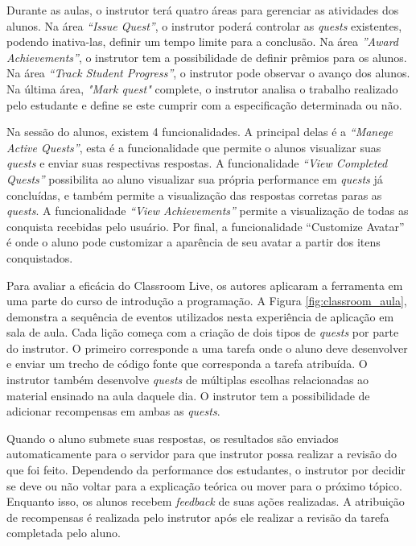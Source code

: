 \documentclass[
	12pt,				%
	oneside,			%
	a4paper,			%
	english,			%
	french,				%
	spanish,			%
	brazil,				%
	]{abntex2}
\begin{document}
Durante as aulas, o instrutor terá quatro áreas para gerenciar as atividades dos alunos. Na área \textit{“Issue Quest”}, o instrutor poderá controlar as \textit{quests} existentes, podendo inativa-las, definir um tempo limite para a conclusão. Na área \textit{”Award Achievements”}, o instrutor tem a possibilidade de definir prêmios para os alunos. Na área \textit{“Track Student Progress”}, o instrutor pode observar o avanço dos alunos. Na última área, \textit{"Mark quest"} complete, o instrutor analisa o trabalho realizado pelo estudante e define se este cumprir com a especificação determinada ou não.

Na sessão do alunos, existem 4 funcionalidades. A principal delas é a \textit{“Manege Active Quests”}, esta é a funcionalidade que permite o alunos visualizar suas \textit{quests} e enviar suas respectivas respostas. A funcionalidade \textit{“View Completed Quests”} possibilita ao aluno visualizar sua própria performance em \textit{quests} já concluídas, e também permite a visualização das respostas corretas paras as \textit{quests}. A funcionalidade \textit{“View Achievements”} permite a visualização de todas as conquista recebidas pelo usuário. Por final, a funcionalidade “Customize Avatar” é onde o aluno pode customizar a aparência de seu avatar a partir dos itens conquistados.

Para avaliar a eficácia do Classroom Live, os autores aplicaram a ferramenta em uma parte do curso de introdução a programação. A Figura \ref{fig:classroom_aula}, demonstra a sequência de eventos utilizados nesta experiência de aplicação em sala de aula. Cada lição começa com a criação de dois tipos de \textit{quests} por parte do instrutor. O primeiro corresponde a uma tarefa onde o aluno deve desenvolver e enviar um trecho de código fonte que corresponda a tarefa atribuída. O instrutor também desenvolve \textit{quests} de múltiplas escolhas relacionadas ao material ensinado na aula daquele dia. O instrutor tem a possibilidade de adicionar recompensas em ambas as \textit{quests}.

Quando o aluno submete suas respostas, os resultados são enviados automaticamente para o servidor para que instrutor possa realizar a revisão do que foi feito. Dependendo da performance dos estudantes, o instrutor por decidir se deve ou não voltar para a explicação teórica ou mover para o próximo tópico. Enquanto isso, os alunos recebem \textit{feedback} de suas ações realizadas. A atribuição de recompensas é realizada pelo instrutor após ele realizar a revisão da tarefa completada pelo aluno.
\end{document}
